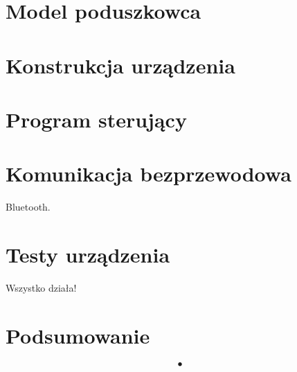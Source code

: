 \documentclass[a4paper, 12pt, twoside, openright]{report}
\begin{document}
\chapter{Model poduszkowca}

\chapter{Konstrukcja urządzenia}

\chapter{Program sterujący}

\chapter{Komunikacja bezprzewodowa}
Bluetooth.
\chapter{Testy urządzenia}
Wszystko działa!
\chapter*{Podsumowanie}
\[•\]

\listoffigures
\listoftables



\end{document}
